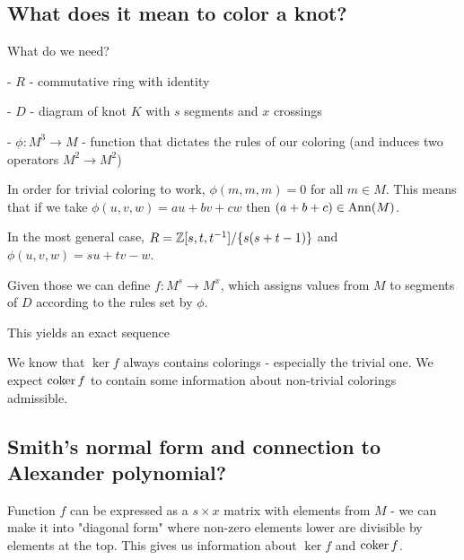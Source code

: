 \subsection{What does it mean to color a knot?}

What do we need?

- $R$ - commutative ring with identity

- $D$ - diagram of knot $K$ with $s$ segments and $x$ crossings

- $\phi:M^3\to M$ - function that dictates the rules of our coloring (and induces two operators $M^2\to M^2$)

In order for trivial coloring to work, $\phi(m,m,m)=0$ for all $m\in M$. This means that if we take $\phi(u, v, w)=au+bv+cw$ then $(a+b+c)\in\operatorname{Ann}(M)$.

In the most general case, $R=\operatorname{\mathbb{Z}}[s, t, t^{-1}]/\{s(s+t-1)\}$ and $\phi(u,v,w)=su+tv-w$.

Given those we can define $f:M^s\to M^x$, which assigns values from $M$ to segments of $D$ according to the rules set by $\phi$.

This yields an exact sequence
\begin{center}\end{center}

We know that $\ker f$ always contains colorings - especially the trivial one. We expect $\operatorname{coker} f$ to contain some information about non-trivial colorings admissible.

\subsection{Smith's normal form \textquestiondown and connection to Alexander polynomial?}

Function $f$ can be expressed as a $s\times x$ matrix with elements from $M$ - we can make it into "diagonal form" where non-zero elements lower are divisible by elements at the top. This gives us information about $\ker f$ and $\operatorname{coker} f$.

